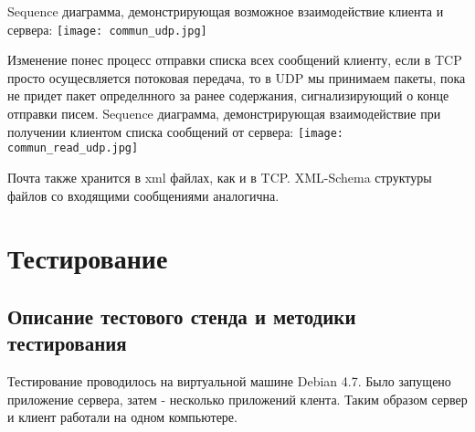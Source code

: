 \documentclass[12pt,a4paper]{report}
\begin{document}
Sequence диаграмма, демонстрирующая возможное взаимодействие клиента и сервера:
\linebreak
\center \texttt{[image: commun\_udp.jpg]}
\flushleft

Изменение понес процесс отправки списка всех сообщений клиенту, если в TCP просто осущесвляется потоковая передача, то в UDP мы принимаем пакеты, пока не придет пакет определнного за ранее содержания, сигнализирующий о конце отправки писем.
\linebreak
\linebreak
Sequence диаграмма, демонстрирующая взаимодействие при получении клиентом списка сообщений от сервера:
\linebreak
\center \texttt{[image: commun\_read\_udp.jpg]}
\flushleft

Почта также хранится в xml файлах, как и в TCP. XML-Schema структуры файлов со входящими сообщениями аналогична.


\section{Тестирование}
\subsection{Описание тестового стенда и методики тестирования}
Тестирование проводилось на виртуальной машине Debian 4.7. Было запущено приложение сервера, затем - несколько приложений клента. Таким образом сервер и клиент работали на одном компьютере.
\end{document}
